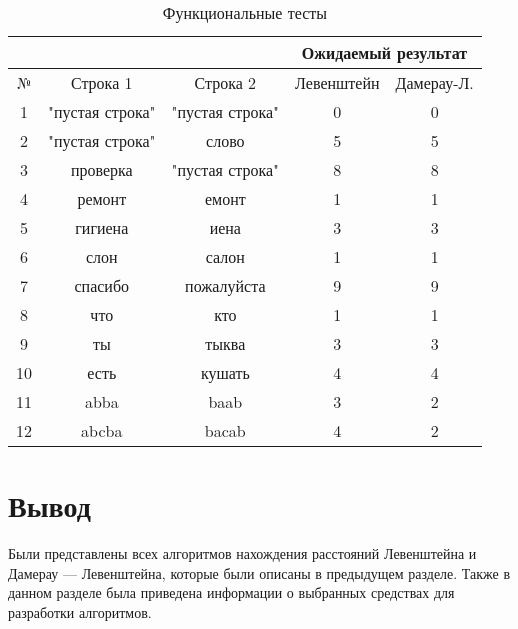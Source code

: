 \begin{table}[h]
	\begin{center}
		\begin{threeparttable}
			\captionsetup{justification=raggedright,singlelinecheck=off}
			\caption{\label{tbl:functional_test} Функциональные тесты}
			\begin{tabular}{|c|c|c|c|c|}
				\hline
				&\multicolumn{2}{c|}{}&\multicolumn{2}{c|}{Ожидаемый результат} \\
				\hline
				№&Строка 1&Строка 2&Левенштейн&Дамерау-Л. \\
				\hline
				1&"пустая строка"&"пустая строка"&0&0 \\
				\hline
				2&"пустая строка"&слово&5&5 \\
				\hline
				3&проверка&"пустая строка"&8&8 \\
				\hline
				4&ремонт&емонт&1&1 \\
				\hline
				5&гигиена&иена&3&3 \\
				\hline
				6&слон&салон&1&1 \\
				\hline
				7&спасибо&пожалуйста&9&9 \\
				\hline
				8&что&кто&1&1 \\
				\hline
				9&ты&тыква&3&3 \\
				\hline
				10&есть&кушать&4&4 \\
				\hline
				11&abba&baab&3&2 \\
				\hline
				12&abcba&bacab&4&2 \\
				\hline
			\end{tabular}
		\end{threeparttable}
	\end{center}
\end{table}

\section*{Вывод}

Были представлены всех алгоритмов нахождения расстояний Левенштейна и Дамерау --- Левенштейна, которые были описаны в предыдущем разделе. Также в данном разделе была приведена информации о выбранных средствах для разработки алгоритмов.
